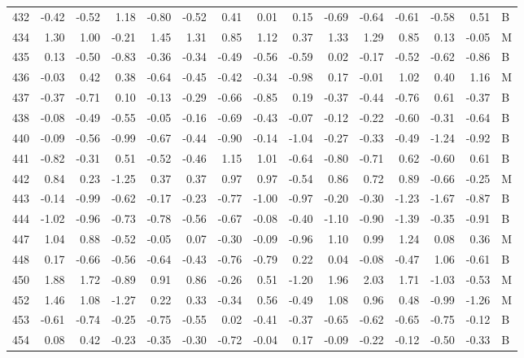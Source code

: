 \begin{table}[ht]
\begin{tabular}{rrrrrrrrrrrrrrl}
  432 & -0.42 & -0.52 & 1.18 & -0.80 & -0.52 & 0.41 & 0.01 & 0.15 & -0.69 & -0.64 & -0.61 & -0.58 & 0.51 & B \\ 
  434 & 1.30 & 1.00 & -0.21 & 1.45 & 1.31 & 0.85 & 1.12 & 0.37 & 1.33 & 1.29 & 0.85 & 0.13 & -0.05 & M \\ 
  435 & 0.13 & -0.50 & -0.83 & -0.36 & -0.34 & -0.49 & -0.56 & -0.59 & 0.02 & -0.17 & -0.52 & -0.62 & -0.86 & B \\ 
  436 & -0.03 & 0.42 & 0.38 & -0.64 & -0.45 & -0.42 & -0.34 & -0.98 & 0.17 & -0.01 & 1.02 & 0.40 & 1.16 & M \\ 
  437 & -0.37 & -0.71 & 0.10 & -0.13 & -0.29 & -0.66 & -0.85 & 0.19 & -0.37 & -0.44 & -0.76 & 0.61 & -0.37 & B \\ 
  438 & -0.08 & -0.49 & -0.55 & -0.05 & -0.16 & -0.69 & -0.43 & -0.07 & -0.12 & -0.22 & -0.60 & -0.31 & -0.64 & B \\ 
  440 & -0.09 & -0.56 & -0.99 & -0.67 & -0.44 & -0.90 & -0.14 & -1.04 & -0.27 & -0.33 & -0.49 & -1.24 & -0.92 & B \\ 
  441 & -0.82 & -0.31 & 0.51 & -0.52 & -0.46 & 1.15 & 1.01 & -0.64 & -0.80 & -0.71 & 0.62 & -0.60 & 0.61 & B \\ 
  442 & 0.84 & 0.23 & -1.25 & 0.37 & 0.37 & 0.97 & 0.97 & -0.54 & 0.86 & 0.72 & 0.89 & -0.66 & -0.25 & M \\ 
  443 & -0.14 & -0.99 & -0.62 & -0.17 & -0.23 & -0.77 & -1.00 & -0.97 & -0.20 & -0.30 & -1.23 & -1.67 & -0.87 & B \\ 
  444 & -1.02 & -0.96 & -0.73 & -0.78 & -0.56 & -0.67 & -0.08 & -0.40 & -1.10 & -0.90 & -1.39 & -0.35 & -0.91 & B \\ 
  447 & 1.04 & 0.88 & -0.52 & -0.05 & 0.07 & -0.30 & -0.09 & -0.96 & 1.10 & 0.99 & 1.24 & 0.08 & 0.36 & M \\ 
  448 & 0.17 & -0.66 & -0.56 & -0.64 & -0.43 & -0.76 & -0.79 & 0.22 & 0.04 & -0.08 & -0.47 & 1.06 & -0.61 & B \\ 
  450 & 1.88 & 1.72 & -0.89 & 0.91 & 0.86 & -0.26 & 0.51 & -1.20 & 1.96 & 2.03 & 1.71 & -1.03 & -0.53 & M \\ 
  452 & 1.46 & 1.08 & -1.27 & 0.22 & 0.33 & -0.34 & 0.56 & -0.49 & 1.08 & 0.96 & 0.48 & -0.99 & -1.26 & M \\ 
  453 & -0.61 & -0.74 & -0.25 & -0.75 & -0.55 & 0.02 & -0.41 & -0.37 & -0.65 & -0.62 & -0.65 & -0.75 & -0.12 & B \\ 
  454 & 0.08 & 0.42 & -0.23 & -0.35 & -0.30 & -0.72 & -0.04 & 0.17 & -0.09 & -0.22 & -0.12 & -0.50 & -0.33 & B \\ 

\end{tabular}
\end{table}
